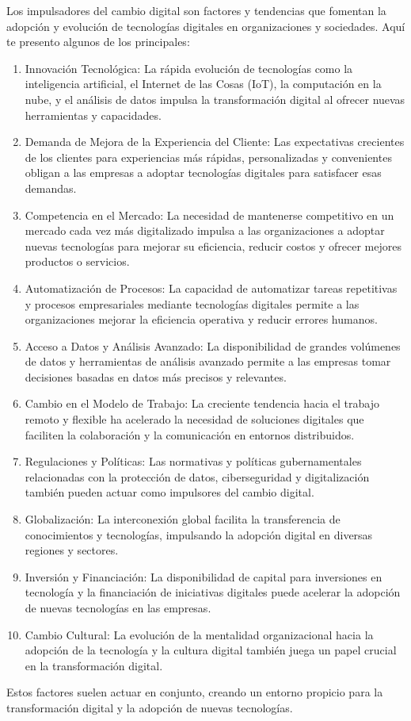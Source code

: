 \documentclass[12pt]{article}
\begin{document}
Los impulsadores del cambio digital son factores y tendencias que fomentan la adopción y evolución de tecnologías digitales en organizaciones y sociedades. Aquí te presento algunos de los principales:
\begin{enumerate} 
\item Innovación Tecnológica: La rápida evolución de tecnologías como la inteligencia artificial, el Internet de las Cosas (IoT), la computación en la nube, y el análisis de datos impulsa la transformación digital al ofrecer nuevas herramientas y capacidades.
\item Demanda de Mejora de la Experiencia del Cliente: Las expectativas crecientes de los clientes para experiencias más rápidas, personalizadas y convenientes obligan a las empresas a adoptar tecnologías digitales para satisfacer esas demandas.
\item Competencia en el Mercado: La necesidad de mantenerse competitivo en un mercado cada vez más digitalizado impulsa a las organizaciones a adoptar nuevas tecnologías para mejorar su eficiencia, reducir costos y ofrecer mejores productos o servicios.
\item Automatización de Procesos: La capacidad de automatizar tareas repetitivas y procesos empresariales mediante tecnologías digitales permite a las organizaciones mejorar la eficiencia operativa y reducir errores humanos.
\item Acceso a Datos y Análisis Avanzado: La disponibilidad de grandes volúmenes de datos y herramientas de análisis avanzado permite a las empresas tomar decisiones basadas en datos más precisos y relevantes.
\item Cambio en el Modelo de Trabajo: La creciente tendencia hacia el trabajo remoto y flexible ha acelerado la necesidad de soluciones digitales que faciliten la colaboración y la comunicación en entornos distribuidos.
\item Regulaciones y Políticas: Las normativas y políticas gubernamentales relacionadas con la protección de datos, ciberseguridad y digitalización también pueden actuar como impulsores del cambio digital.
\item Globalización: La interconexión global facilita la transferencia de conocimientos y tecnologías, impulsando la adopción digital en diversas regiones y sectores.
\item Inversión y Financiación: La disponibilidad de capital para inversiones en tecnología y la financiación de iniciativas digitales puede acelerar la adopción de nuevas tecnologías en las empresas.
\item Cambio Cultural: La evolución de la mentalidad organizacional hacia la adopción de la tecnología y la cultura digital también juega un papel crucial en la transformación digital.
\end{enumerate}
Estos factores suelen actuar en conjunto, creando un entorno propicio para la transformación digital y la adopción de nuevas tecnologías.
\cite{mckinsey2020}
\end{document}
